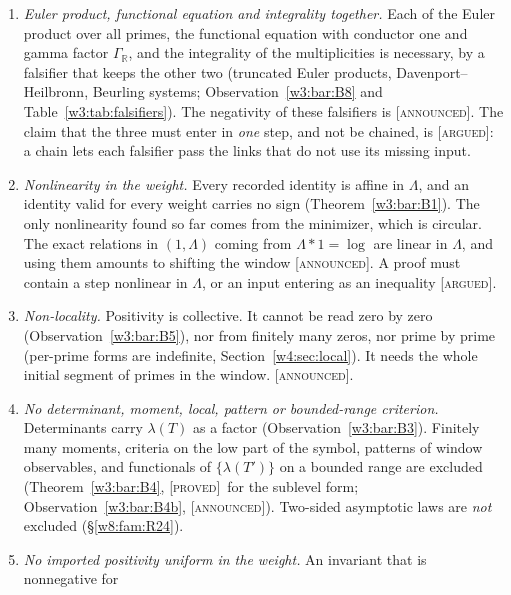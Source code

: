 \documentclass[11pt]{amsart}
\theoremstyle{definition}
\theoremstyle{remark}
\numberwithin{equation}{section}
\newcommand{\R}{\mathbb{R}}
\newcommand{\PT}{\mathcal{P}_T}                        %
\newcommand{\lam}{\lambda(T)}                          %
\newcommand{\Tarch}{T^{*}_{\infty,\mathrm P}}          %
\newcommand{\stag}[1]{\textsc{[#1]}}
\newcommand{\PROVED}{\stag{proved}}
\newcommand{\ARGUED}{\stag{argued}}
\newcommand{\ANNOUNCED}{\stag{announced}}
\begin{document}
\begin{enumerate}[label=\textbf{C\arabic*.},ref=C\arabic*,leftmargin=*]
$(2t_0/\pi)T-3\approx4T-3$ negative directions on $\PT$ (Theorem~\ref{w2:thm:archcount}; the matching upper bound is \ANNOUNCED). Beyond the archimedean threshold $\Tarch$ the
primes must pay for them (Observation~\ref{w2:obs:arch}). The two parts cannot be bounded separately. \PROVED\ for the
lower bound of the count; the impossibility of separate estimates is announced in several classes \ANNOUNCED.
\item\label{w8:con:inputs} \emph{Euler product, functional equation and integrality together.} Each of the Euler
product over all primes, the functional equation with conductor one and gamma factor $\Gamma_\R$, and the integrality
of the multiplicities is necessary, by a falsifier that keeps the other two (truncated Euler products,
Davenport--Heilbronn, Beurling systems; Observation~\ref{w3:bar:B8} and Table~\ref{w3:tab:falsifiers}). The negativity
of these falsifiers is \ANNOUNCED. The claim that the three must enter in \emph{one} step, and not be chained, is
\ARGUED: a chain lets each falsifier pass the links that do not use its missing input.
\item\label{w8:con:nonlin} \emph{Nonlinearity in the weight.} Every recorded identity is affine in $\Lambda$, and an
identity valid for every weight carries no sign (Theorem~\ref{w3:bar:B1}). The only nonlinearity found so far comes
from the minimizer, which is circular. The exact relations in $(1,\Lambda)$ coming from $\Lambda*1=\log$ are linear in
$\Lambda$, and using them amounts to shifting the window \ANNOUNCED. A proof must contain a step nonlinear in
$\Lambda$, or an input entering as an inequality \ARGUED.
\item\label{w8:con:nonlocal} \emph{Non-locality.} Positivity is collective. It cannot be read zero by zero
(Observation~\ref{w3:bar:B5}), nor from finitely many zeros, nor prime by prime (per-prime forms are indefinite,
Section~\ref{w4:sec:local}). It needs the whole initial segment of primes in the window. \ANNOUNCED.
\item\label{w8:con:criteria} \emph{No determinant, moment, local, pattern or bounded-range criterion.} Determinants carry
$\lam$ as a factor (Observation~\ref{w3:bar:B3}). Finitely many moments, criteria on the low part of the symbol,
patterns of window observables, and functionals of $\{\lambda(T')\}$ on a bounded range are excluded
(Theorem~\ref{w3:bar:B4}, \PROVED\ for the sublevel form; Observation~\ref{w3:bar:B4b}, \ANNOUNCED). Two-sided
asymptotic laws are \emph{not} excluded (\S\ref{w8:fam:R24}).
\item\label{w8:con:import} \emph{No imported positivity uniform in the weight.} An invariant that is nonnegative for

\end{enumerate}
\end{document}
